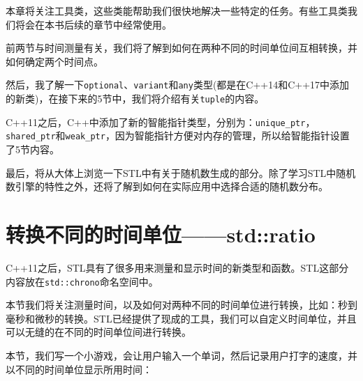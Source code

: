 本章将关注工具类，这些类能帮助我们很快地解决一些特定的任务。有些工具类我们将会在本书后续的章节中经常使用。

前两节与时间测量有关，我们将了解到如何在两种不同的时间单位间互相转换，并如何确定两个时间点。

然后，我了解一下\texttt{optional}、\texttt{variant}和\texttt{any}类型(都是在C++14和C++17中添加的新类)，在接下来的5节中，我们将介绍有关\texttt{tuple}的内容。

C++11之后，C++中添加了新的智能指针类型，分别为：\texttt{unique\_ptr}，\texttt{shared\_ptr}和\texttt{weak\_ptr}，因为智能指针方便对内存的管理，所以给智能指针设置了5节内容。

最后，将从大体上浏览一下STL中有关于随机数生成的部分。除了学习STL中随机数引擎的特性之外，还将了解到如何在实际应用中选择合适的随机数分布。


\section{转换不同的时间单位——std::ratio}

C++11之后，STL具有了很多用来测量和显示时间的新类型和函数。STL这部分内容放在\texttt{std::chrono}命名空间中。

本节我们将关注测量时间，以及如何对两种不同的时间单位进行转换，比如：秒到毫秒和微秒的转换。STL已经提供了现成的工具，我们可以自定义时间单位，并且可以无缝的在不同的时间单位间进行转换。


本节，我们写一个小游戏，会让用户输入一个单词，然后记录用户打字的速度，并以不同的时间单位显示所用时间：

